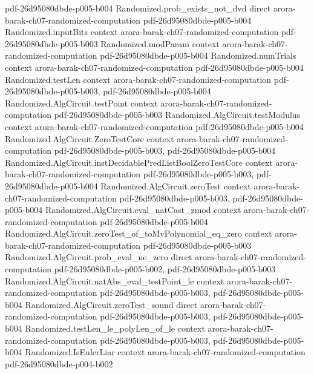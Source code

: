 \begin{theorem}
  {pdf-26d95080dbde-p005-b004}
\proofstep
  {Randomized.prob_exists_not_dvd}
  {direct}
  {arora-barak-ch07-randomized-computation}
  {pdf-26d95080dbde-p005-b004}
\proofstep
  {Randomized.inputBits}
  {context}
  {arora-barak-ch07-randomized-computation}
  {pdf-26d95080dbde-p005-b003}
\proofstep
  {Randomized.modParam}
  {context}
  {arora-barak-ch07-randomized-computation}
  {pdf-26d95080dbde-p005-b004}
\proofstep
  {Randomized.numTrials}
  {context}
  {arora-barak-ch07-randomized-computation}
  {pdf-26d95080dbde-p005-b004}
\proofstep
  {Randomized.testLen}
  {context}
  {arora-barak-ch07-randomized-computation}
  {pdf-26d95080dbde-p005-b003,
    pdf-26d95080dbde-p005-b004}
\proofstep
  {Randomized.AlgCircuit.testPoint}
  {context}
  {arora-barak-ch07-randomized-computation}
  {pdf-26d95080dbde-p005-b003}
\proofstep
  {Randomized.AlgCircuit.testModulus}
  {context}
  {arora-barak-ch07-randomized-computation}
  {pdf-26d95080dbde-p005-b004}
\proofstep
  {Randomized.AlgCircuit.ZeroTestCore}
  {context}
  {arora-barak-ch07-randomized-computation}
  {pdf-26d95080dbde-p005-b003,
    pdf-26d95080dbde-p005-b004}
\proofstep
  {Randomized.AlgCircuit.instDecidablePredListBoolZeroTestCore}
  {context}
  {arora-barak-ch07-randomized-computation}
  {pdf-26d95080dbde-p005-b003,
    pdf-26d95080dbde-p005-b004}
\proofstep
  {Randomized.AlgCircuit.zeroTest}
  {context}
  {arora-barak-ch07-randomized-computation}
  {pdf-26d95080dbde-p005-b003,
    pdf-26d95080dbde-p005-b004}
\proofstep
  {Randomized.AlgCircuit.eval_natCast_zmod}
  {context}
  {arora-barak-ch07-randomized-computation}
  {pdf-26d95080dbde-p005-b004}
\proofstep
  {Randomized.AlgCircuit.zeroTest_of_toMvPolynomial_eq_zero}
  {context}
  {arora-barak-ch07-randomized-computation}
  {pdf-26d95080dbde-p005-b003}
\proofstep
  {Randomized.AlgCircuit.prob_eval_ne_zero}
  {direct}
  {arora-barak-ch07-randomized-computation}
  {pdf-26d95080dbde-p005-b002,
    pdf-26d95080dbde-p005-b003}
\proofstep
  {Randomized.AlgCircuit.natAbs_eval_testPoint_le}
  {context}
  {arora-barak-ch07-randomized-computation}
  {pdf-26d95080dbde-p005-b003,
    pdf-26d95080dbde-p005-b004}
\proofstep
  {Randomized.AlgCircuit.zeroTest_sound}
  {direct}
  {arora-barak-ch07-randomized-computation}
  {pdf-26d95080dbde-p005-b003,
    pdf-26d95080dbde-p005-b004}
\proofstep
  {Randomized.testLen_le_polyLen_of_le}
  {context}
  {arora-barak-ch07-randomized-computation}
  {pdf-26d95080dbde-p005-b003,
    pdf-26d95080dbde-p005-b004}
\proofstep
  {Randomized.IsEulerLiar}
  {context}
  {arora-barak-ch07-randomized-computation}
  {pdf-26d95080dbde-p004-b002}

\end{theorem}
